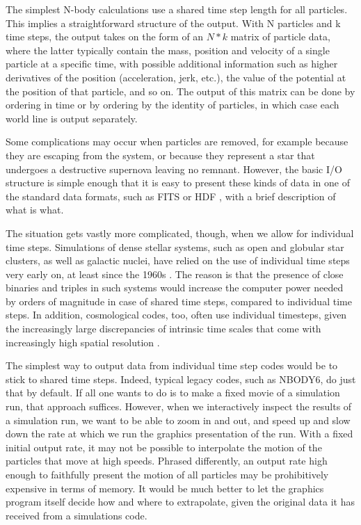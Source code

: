 \documentclass[5p,authoryear]{elsarticle}
\begin{document}
The simplest N-body calculations use a shared time step length for all
particles.  This implies a straightforward structure of the output.
With N particles and k time steps, the output takes on the form of an
$N*k$ matrix of particle data, where the latter typically contain the
mass, position and velocity of a single particle at a specific time,
with possible additional information such as higher derivatives of the
position (acceleration, jerk, etc.), the value of the potential at the
position of that particle, and so on.  The output of this matrix can
be done by ordering in time or by ordering by the identity of
particles, in which case each world line is output separately.

Some complications may occur when particles are removed, for example
because they are escaping from the system, or because they represent a
star that undergoes a destructive supernova leaving no remnant.
However, the basic I/O structure is simple enough that it is easy to
present these kinds of data in one of the standard data formats, such
as FITS \citep{Pence2010} or HDF \citep{HDF2011}, with a brief
description of what is what.

The situation gets vastly more complicated, though, when we allow for
individual time steps.  Simulations of dense stellar systems, such as
open and globular star clusters, as well as galactic nuclei, have
relied on the use of individual time steps very early on, at least
since the 1960s \citep{Aarseth2009}.  The reason is that the presence
of close binaries and triples in such systems would increase the
computer power needed by orders of magnitude in case of shared time
steps, compared to individual time steps.  In addition, cosmological
codes, too, often use individual timesteps, given the increasingly
large discrepancies of intrinsic time scales that come with
increasingly high spatial resolution \citep[e.g.][]{Springel2005}.

The simplest way to output data from individual time step codes would
be to stick to shared time steps.  Indeed, typical legacy codes, such
as NBODY6, do just that by default.  If all one wants to do is to make
a fixed movie of a simulation run, that approach suffices.  However,
when we interactively inspect the results of a simulation run, we want
to be able to zoom in and out, and speed up and slow down the rate at
which we run the graphics presentation of the run.  With a fixed
initial output rate, it may not be possible to interpolate the motion
of the particles that move at high speeds.  Phrased differently, an
output rate high enough to faithfully present the motion of all
particles may be prohibitively expensive in terms of memory.  It would
be much better to let the graphics program itself decide how and where
to extrapolate, given the original data it has received from a
simulations code.
\end{document}
